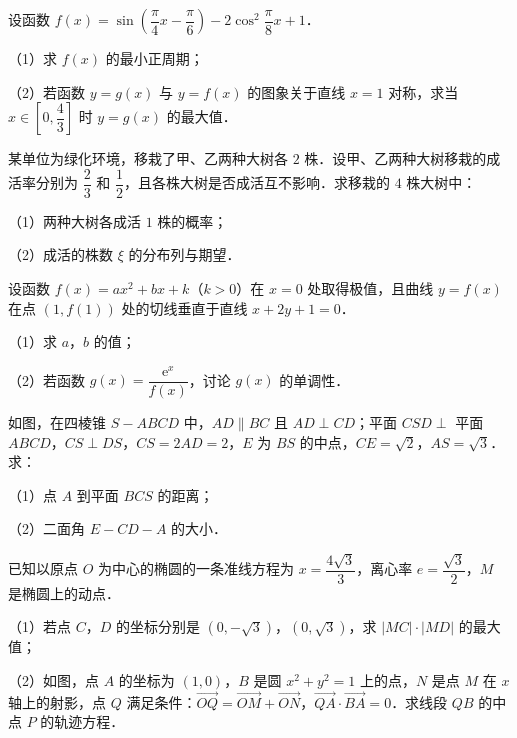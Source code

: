 \begin{question}
设函数 $f(x)=\sin\left(\dfrac\pi4x-\dfrac\pi6\right)-2\cos^2\dfrac\pi8x+1$．

（1）求 $f(x)$ 的最小正周期；

（2）若函数 $y=g(x)$ 与 $y=f(x)$ 的图象关于直线 $x=1$ 对称，求当 $x\in\left[0,\dfrac43\right]$ 时 $y=g(x)$ 的最大值．

\end{question}
\begin{question}
某单位为绿化环境，移栽了甲、乙两种大树各 $2$ 株．设甲、乙两种大树移栽的成活率分别为 $\dfrac23$ 和 $\dfrac12$，且各株大树是否成活互不影响．求移栽的 $4$ 株大树中：

（1）两种大树各成活 $1$ 株的概率；

（2）成活的株数 $\xi$ 的分布列与期望．

\end{question}
\begingroup
\renewenvironment{question}{\Needspace{0.5\textheight}}{}
\begin{question}
设函数 $f(x)=ax^2+bx+k$（$k>0$）在 $x=0$ 处取得极值，且曲线 $y=f(x)$ 在点 $(1,f(1))$ 处的切线垂直于直线 $x+2y+1=0$．

（1）求 $a$，$b$ 的值；

（2）若函数 $g(x)=\dfrac{\mathrm e^x}{f(x)}$，讨论 $g(x)$ 的单调性．

\Needspace{0.4\textheight}
\end{question}
\endgroup
\begin{question}
如图，在四棱锥 $S-ABCD$ 中，$AD\parallel BC$ 且 $AD\perp CD$；平面 $CSD\perp$ 平面 $ABCD$，$CS\perp DS$，$CS=2AD=2$，$E$ 为 $BS$ 的中点，$CE=\sqrt2$，$AS=\sqrt3$．求：

（1）点 $A$ 到平面 $BCS$ 的距离；

（2）二面角 $E-CD-A$ 的大小．
\nopagebreak[4]
\begin{center}\end{center}
\nopagebreak[4]
\Needspace{0.4\textheight}
\end{question}
\begingroup
\renewenvironment{question}{\Needspace{0.5\textheight}}{}
\begin{question}
已知以原点 $O$ 为中心的椭圆的一条准线方程为 $x=\dfrac{4\sqrt3}3$，离心率 $e=\dfrac{\sqrt3}2$，$M$ 是椭圆上的动点．

（1）若点 $C$，$D$ 的坐标分别是 $(0,-\sqrt3)$，$(0,\sqrt3)$，求 $|MC|\cdot|MD|$ 的最大值；

（2）如图，点 $A$ 的坐标为 $(1,0)$，$B$ 是圆 $x^2+y^2=1$ 上的点，$N$ 是点 $M$ 在 $x$ 轴上的射影，点 $Q$ 满足条件：$\overrightarrow{OQ}=\overrightarrow{OM}+\overrightarrow{ON}$，$\overrightarrow{QA}\cdot\overrightarrow{BA}=0$．求线段 $QB$ 的中点 $P$ 的轨迹方程．
\nopagebreak[4]
\begin{center}\end{center}
\nopagebreak[4]
\end{question}
